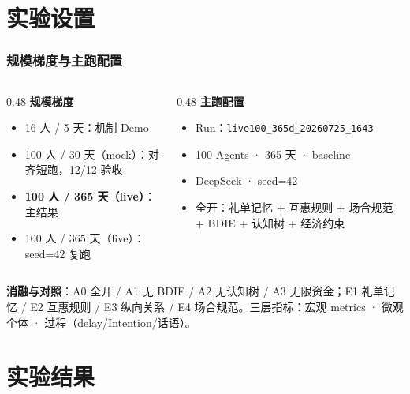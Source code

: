 \documentclass[AutoFakeBold,AutoFakeSlant]{beamer}
\begin{document}
\section{实验设置}

\begin{frame}
    \frametitle{规模梯度与主跑配置}
    \small
    \begin{columns}
        \begin{column}{0.48\textwidth}
            \textbf{规模梯度}
            \begin{itemize}
                \item 16 人 / 5 天：机制 Demo
                \item 100 人 / 30 天（mock）：对齐短跑，12/12 验收
                \item \textbf{100 人 / 365 天（live）}：主结果
                \item 100 人 / 365 天（live）：seed=42 复跑
            \end{itemize}
        \end{column}
        \begin{column}{0.48\textwidth}
            \textbf{主跑配置}
            \begin{itemize}
                \item Run：\texttt{live100\_365d\_20260725\_1643}
                \item 100 Agents · 365 天 · baseline
                \item DeepSeek · seed=42
                \item 全开：礼单记忆 + 互惠规则 + 场合规范 + BDIE + 认知树 + 经济约束
            \end{itemize}
        \end{column}
    \end{columns}
    \vspace{0.4em}
    \textbf{消融与对照}：A0 全开 / A1 无 BDIE / A2 无认知树 / A3 无限资金；E1 礼单记忆 / E2 互惠规则 / E3 纵向关系 / E4 场合规范。三层指标：宏观 metrics · 微观个体 · 过程（delay/Intention/话语）。
\end{frame}

\section{实验结果}
\end{document}
